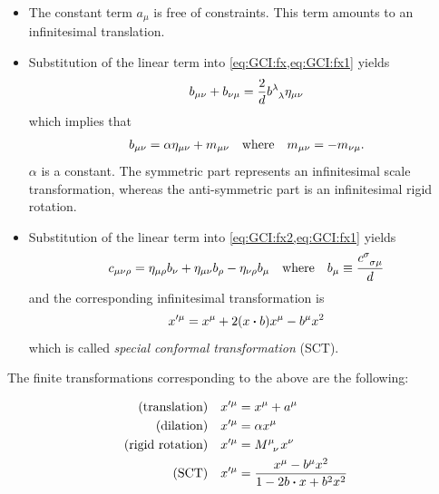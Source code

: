 \documentclass[10pt]{article}
\newenvironment{boxmath}[1]{\begin{tcolorbox}[enhanced,attach boxed title to top center={yshift=-\tcboxedtitleheight/2},boxrule=1pt,title={\centering #1},colframe=NavyBlue!70!black,colback=NavyBlue!10,colbacktitle=NavyBlue!10,fonttitle=\scshape,coltitle=Black]}{\end{tcolorbox}}
\begin{document}
\begin{itemize}
    \item The constant term $a_\mu$ is free of constraints.
          This term amounts to an infinitesimal translation.
    \item Substitution of the linear term into \cref{eq:GCI:fx,eq:GCI:fx1} yields
          \begin{align}
              b_{\mu\nu}+b_{\nu\mu}=\frac{2}{d}\tensor{b}{^\lambda_\lambda}\eta_{\mu\nu}
          \end{align}
          which implies that
          \begin{align}
              b_{\mu\nu}=\alpha\eta_{\mu\nu}+m_{\mu\nu}\qq{where}m_{\mu\nu}=-m_{\nu\mu}.
          \end{align}
          $\alpha$ is a constant.
          The symmetric part represents an infinitesimal scale transformation, whereas the anti-symmetric part is an infinitesimal rigid rotation.
    \item Substitution of the linear term into \cref{eq:GCI:fx2,eq:GCI:fx1} yields
          \begin{align}
              c_{\mu\nu\rho}=\eta_{\mu\rho}b_{\nu}+\eta_{\mu\nu}b_{\rho}-\eta_{\nu\rho}b_{\mu}\qq{where}b_{\mu}\equiv\frac{\tensor{c}{^\sigma_\sigma_\mu}}{d}
          \end{align}
          and the corresponding infinitesimal transformation is
          \begin{align}
              x'^\mu=x^\mu+2(x\vdot b)x^\mu-b^\mu x^2
          \end{align}
          which is called \textit{special conformal transformation} (SCT).
\end{itemize}
The finite transformations corresponding to the above are the following:
\begin{boxmath}{Finite Conformal Transformation}
    \begin{subequations}
        \begin{align}
            \text{(translation)}    & \quad x'^\mu=x^\mu+a^\mu                                 \\
            \text{(dilation)}       & \quad x'^\mu=\alpha x^\mu                                \\
            \text{(rigid rotation)} & \quad x'^\mu=\tensor{M}{^\mu_\nu}x^\nu                   \\
            \text{(SCT)}            & \quad x'^\mu=\frac{x^\mu-b^\mu x^2}{1-2b\vdot x+b^2 x^2}
        \end{align}
    \end{subequations}
\end{boxmath}
\end{document}
